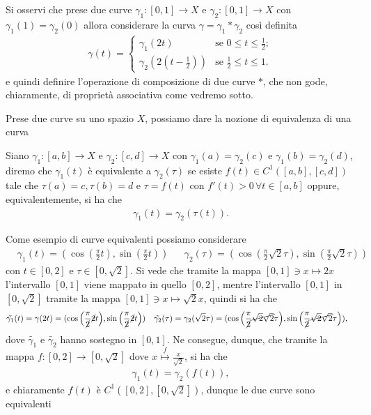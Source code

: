 Si osservi che prese due curve $\gamma_1: [0,1] \to X$ e $\gamma_2: [0,1] \to X$ con $\gamma_1(1)=\gamma_2(0)$ allora considerare la curva $\gamma = \gamma_1 \ast \gamma_2$ così definita
\begin{align}
    \gamma(t) = \begin{cases}
        \gamma_1(2t) & \text{se } 0 \leq t \leq \frac{1}{2}; \\
        \gamma_2(2(t - \frac{1}{2})) & \text{se } \frac{1}{2} \leq t \leq 1.
    \end{cases}
\end{align}
e quindi definire l'operazione di composizione di due curve $\ast$, che non gode, chiaramente, di proprietà associativa come vedremo sotto.

Prese due curve su uno spazio $X$, possiamo dare la nozione di equivalenza di una curva
\begin{definition}
    Siano $\gamma_1 : [a,b] \to X$ e $\gamma_2 : [c,d] \to X$ con $\gamma_1(a) = \gamma_2(c)$ e $\gamma_1(b) = \gamma_2(d)$, diremo che $\gamma_1(t)$ è equivalente a $\gamma_2(\tau)$ se esiste $f(t) \in C^1([a, b], [c,d])$ tale che $\tau(a) = c, \tau(b) = d$ e $\tau = f(t)$ con $f'(t) > 0 \, \forall t \in [a,b]$ oppure, equivalentemente, si ha che
    \begin{align}
        \gamma_1(t) = \gamma_2(\tau(t)).
    \end{align}
\end{definition}

\begin{example}
    Come esempio di curve equivalenti possiamo considerare
    \begin{align}
        &\gamma_1(t) = (\cos{\left( \frac{\pi}{2} t \right)} ,\sin{\left( \frac{\pi}{2} t \right)}) & &\gamma_2(\tau) = (\cos{\left( \frac{\pi}{2} \sqrt{2} \tau \right), \sin{\left( \frac{\pi}{2} \sqrt{2} \tau \right)}})
    \end{align}
    con $t \in [0, 2]$ e $\tau \in [0, \sqrt{2}]$. Si vede che tramite la mappa $[0,1] \ni x \mapsto 2x$ l'intervallo $[0,1]$ viene mappato in quello $[0,2]$, mentre l'intervallo $[0,1]$ in $[0, \sqrt{2}]$ tramite la mappa $[0,1] \ni x \mapsto \sqrt{2} x$, quindi si ha che
    \begin{align}
        &\tilde{\gamma_1}(t) = \gamma(2t) = (\cos{\left( \frac{\pi}{\cancel{2}} \cancel{2}t \right)}, \sin{\left( \frac{\pi}{\cancel{2}} \cancel{2}t \right)}) & &\tilde{\gamma_2}(\tau) = \gamma_2(\sqrt{2} \tau) = (\cos{\left( \frac{\pi}{\cancel{2}} \cancel{\sqrt{2} \sqrt{2}} \tau \right)}, \sin{\left( \frac{\pi}{\cancel{2}} \cancel{\sqrt{2} \sqrt{2}}\tau \right)}),
    \end{align}
    dove $\tilde{\gamma_1}$ e  $\tilde{\gamma_2}$ hanno sostegno in $[0,1]$. Ne consegue, dunque, che tramite la mappa $f: [0, 2] \to [0, \sqrt{2}]$ dove $x \stackrel{f}{\mapsto} \frac{x}{\sqrt{2}}$, si ha che
    \begin{align}
        \gamma_1(t) = \gamma_2(f(t)),
    \end{align}
    e chiaramente $f(t)$ è $C^1([0, 2], [0, \sqrt{2}])$, dunque le due curve sono equivalenti
\end{example}

